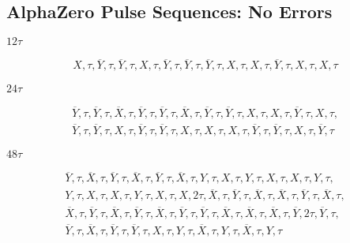 \subsection{AlphaZero Pulse Sequences: No Errors}

\noindent $12\tau$

\begin{equation*}
\begin{aligned}
    X, \tau, \overline{Y}, \tau, \overline{Y}, \tau, X, \tau, \overline{Y}, \tau, \overline{Y}, \tau, \overline{Y}, \tau, X, \tau, X, \tau, \overline{Y}, \tau, X, \tau, X, \tau
\end{aligned}
\end{equation*}

\noindent $24\tau$

\begin{equation*}
\begin{aligned}
    \overline{Y}, \tau, \overline{Y}, \tau, \overline{X}, \tau, \overline{Y}, \tau, \overline{Y}, \tau, \overline{X}, \tau, \overline{Y}, \tau, \overline{Y}, \tau, X, \tau, X, \tau, \overline{Y}, \tau, X, \tau, \\
    \overline{Y}, \tau, \overline{Y}, \tau, X, \tau, \overline{Y}, \tau, \overline{Y}, \tau, X, \tau, X, \tau, X, \tau, \overline{Y}, \tau, \overline{Y}, \tau, X, \tau, \overline{Y}, \tau
\end{aligned}
\end{equation*}

\noindent $48\tau$

\begin{equation*}
\begin{aligned}
    \overline{Y}, \tau, \overline{X}, \tau, \overline{Y}, \tau, \overline{X}, \tau, \overline{Y}, \tau, \overline{X}, \tau, Y, \tau, X, \tau, Y, \tau, X, \tau, X, \tau, Y, \tau, \\
    Y, \tau, X, \tau, X, \tau, Y, \tau, X, \tau, X, 2\tau, \overline{X}, \tau, \overline{Y}, \tau, \overline{X}, \tau, \overline{X}, \tau, \overline{Y}, \tau, \overline{X}, \tau, \\
    \overline{X}, \tau, \overline{Y}, \tau, \overline{X}, \tau, \overline{Y}, \tau, \overline{X}, \tau, \overline{Y}, \tau, \overline{Y}, \tau,
    \overline{X}, \tau, \overline{X}, \tau, \overline{X}, \tau, \overline{Y}, 2\tau, \overline{Y}, \tau, \\
    \overline{Y}, \tau, \overline{X}, \tau, \overline{Y}, \tau, \overline{Y}, \tau, X, \tau, Y, \tau, \overline{X}, \tau, Y, \tau, \overline{X}, \tau, Y, \tau
\end{aligned}
\end{equation*}


